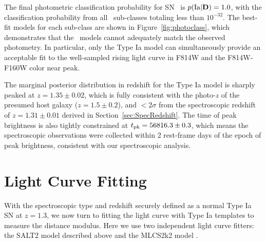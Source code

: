 The final photometric classification probability for SN \tomas\ is
$p({\rm Ia}|{\rm {\bf D}})=1.0$, with the classification probability
from all \CCSN\ sub-classes totaling less than $10^{-32}$.  The
best-fit models for each sub-class are shown in
Figure~\ref{fig:photoclass}, which demonstrates that the \CCSN\ models
cannot adequately match the observed photometry. In particular, only
the Type Ia model can simultaneously provide an acceptable fit to the
well-sampled rising light curve in F814W and the F814W-F160W
color near peak.

The marginal posterior distribution in redshift for the Type Ia model
is sharply peaked at $z=1.35\pm0.02$, which is fully consistent with
the photo-$z$ of the presumed host galaxy ($z=1.5\pm0.2$), and
$<2\sigma$ from the spectroscopic redshift of $z=1.31\pm0.01$ derived
in Section~\ref{sec:SpecRedshift}.  The time of peak brightness is
also tightly constrained at $t_{\rm pk}=56816.3\pm0.3$, which means
the spectroscopic observations were collected within 2 rest-frame days
of the epoch of peak brightness, consistent with our spectroscopic
analysis.


\section{Light Curve Fitting}
\label{sec:LightCurveFitting}

With the spectroscopic type and redshift securely defined as a normal
Type Ia SN at $z=1.3$, we now turn to fitting the light curve with
Type Ia templates to measure the distance modulus.  Here we use two
independent light curve fitters: the SALT2 model described
above and the MLCS2k2 model \citep{Jha:2007}.   


